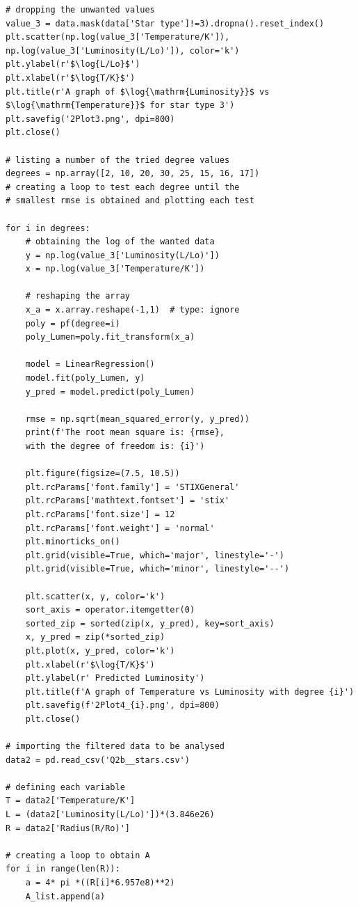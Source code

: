\documentclass[12pt, a4paper]{article}
\begin{document}
\begin{verbatim}
# dropping the unwanted values
value_3 = data.mask(data['Star type']!=3).dropna().reset_index()
plt.scatter(np.log(value_3['Temperature/K']), 
np.log(value_3['Luminosity(L/Lo)']), color='k')
plt.ylabel(r'$\log{L/Lo}$')
plt.xlabel(r'$\log{T/K}$')
plt.title(r'A graph of $\log{\mathrm{Luminosity}}$ vs $\log{\mathrm{Temperature}}$ for star type 3')
plt.savefig('2Plot3.png', dpi=800)
plt.close()

# listing a number of the tried degree values
degrees = np.array([2, 10, 20, 30, 25, 15, 16, 17])
# creating a loop to test each degree until the
# smallest rmse is obtained and plotting each test

for i in degrees:
    # obtaining the log of the wanted data
    y = np.log(value_3['Luminosity(L/Lo)'])
    x = np.log(value_3['Temperature/K'])

    # reshaping the array
    x_a = x.array.reshape(-1,1)  # type: ignore
    poly = pf(degree=i)
    poly_Lumen=poly.fit_transform(x_a)

    model = LinearRegression()
    model.fit(poly_Lumen, y)
    y_pred = model.predict(poly_Lumen)

    rmse = np.sqrt(mean_squared_error(y, y_pred))
    print(f'The root mean square is: {rmse}, 
    with the degree of freedom is: {i}')

    plt.figure(figsize=(7.5, 10.5))
    plt.rcParams['font.family'] = 'STIXGeneral'
    plt.rcParams['mathtext.fontset'] = 'stix'
    plt.rcParams['font.size'] = 12
    plt.rcParams['font.weight'] = 'normal'
    plt.minorticks_on()
    plt.grid(visible=True, which='major', linestyle='-')
    plt.grid(visible=True, which='minor', linestyle='--')

    plt.scatter(x, y, color='k')
    sort_axis = operator.itemgetter(0)
    sorted_zip = sorted(zip(x, y_pred), key=sort_axis)
    x, y_pred = zip(*sorted_zip)
    plt.plot(x, y_pred, color='k')
    plt.xlabel(r'$\log{T/K}$')
    plt.ylabel(r' Predicted Luminosity')
    plt.title(f'A graph of Temperature vs Luminosity with degree {i}')
    plt.savefig(f'2Plot4_{i}.png', dpi=800)
    plt.close()

# importing the filtered data to be analysed
data2 = pd.read_csv('Q2b__stars.csv')

# defining each variable
T = data2['Temperature/K']
L = (data2['Luminosity(L/Lo)'])*(3.846e26)
R = data2['Radius(R/Ro)']

# creating a loop to obtain A
for i in range(len(R)):
    a = 4* pi *((R[i]*6.957e8)**2)
    A_list.append(a)


\end{verbatim}
\end{document}
